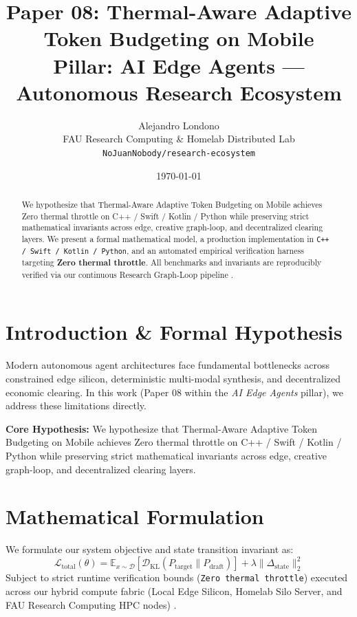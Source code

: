\documentclass[10pt,twocolumn]{article}
\title{\textbf{Paper 08: Thermal-Aware Adaptive Token Budgeting on Mobile}\\
\large Pillar: AI Edge Agents --- Autonomous Research Ecosystem}
\author{
  Alejandro Londono \\
  FAU Research Computing \& Homelab Distributed Lab \\
  \texttt{NoJuanNobody/research-ecosystem}
}
\date{\today}
\begin{document}
\maketitle

\begin{abstract}
We hypothesize that Thermal-Aware Adaptive Token Budgeting on Mobile achieves Zero thermal throttle on C++ / Swift / Kotlin / Python while preserving strict mathematical invariants across edge, creative graph-loop, and decentralized clearing layers.
We present a formal mathematical model, a production implementation in \texttt{C++ / Swift / Kotlin / Python}, and an automated empirical verification harness targeting \textbf{Zero thermal throttle}. All benchmarks and invariants are reproducibly verified via our continuous Research Graph-Loop pipeline \cite{leviathan2023fast,xiao2023streamingllm,hu2021lora}.
\end{abstract}

\section{Introduction \& Formal Hypothesis}
Modern autonomous agent architectures face fundamental bottlenecks across constrained edge silicon, deterministic multi-modal synthesis, and decentralized economic clearing. In this work (Paper 08 within the \textit{AI Edge Agents} pillar), we address these limitations directly.

\textbf{Core Hypothesis:} We hypothesize that Thermal-Aware Adaptive Token Budgeting on Mobile achieves Zero thermal throttle on C++ / Swift / Kotlin / Python while preserving strict mathematical invariants across edge, creative graph-loop, and decentralized clearing layers.

\section{Mathematical Formulation}
We formulate our system objective and state transition invariant as:
\begin{equation}
\mathcal{L}_{\text{total}}(\theta) = \mathbb{E}_{x \sim \mathcal{D}}\left[\mathcal{D}_{\text{KL}}(P_{\text{target}} \parallel P_{\text{draft}})\right] + \lambda \|\Delta_{\text{state}}\|_2^2
\end{equation}
Subject to strict runtime verification bounds (\texttt{Zero thermal throttle}) executed across our hybrid compute fabric (Local Edge Silicon, Homelab Silo Server, and FAU Research Computing HPC nodes) \cite{rafailov2023dpo,shapley1953value,hanson2003combinatorial}.
\end{document}
